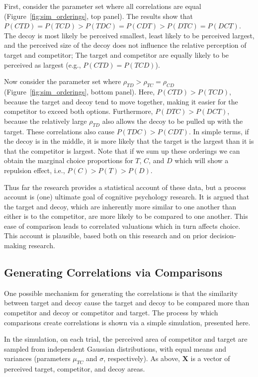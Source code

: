 First, consider the parameter set where all correlations are equal (Figure~\ref{fig:sim_orderings}, top panel). The results show that $P(CTD)=P(TCD)>P(TDC)=P(CDT)>P(DTC)=P(DCT)$. The decoy is most likely be perceived smallest, least likely to be perceived largest, and the perceived size of the decoy does not influence the relative perception of target and competitor; The target and competitor are equally likely to be perceived as largest (e.g., $P(CTD)=P(TCD)$).

Now consider the parameter set where $\rho_{TD}>\rho_{TC}=\rho_{CD}$ (Figure~\ref{fig:sim_orderings}, bottom panel). Here, $P(CTD)>P(TCD)$, because the target and decoy tend to move together, making it easier for the competitor to exceed both options. Furthermore, $P(DTC)>P(DCT)$, because the relatively large $\rho_{TD}$ also allows the decoy to be pulled up with the target. These correlations also cause $P(TDC)>P(CDT)$. In simple terms, if the decoy is in the middle, it is more likely that the target is the largest than it is that the competitor is largest. Note that if we sum up these orderings we can obtain the marginal choice proportions for $T$, $C$, and $D$ which will show a repulsion effect, i.e., $P(C)>P(T)>P(D)$. 

Thus far the research provides a statistical account of these data, but a process account is (one) ultimate goal of cognitive psychology research. It is argued that the target and decoy, which are inherently more similar to one another than either is to the competitor, are more likely to be compared to one another. This ease of comparison leads to correlated valuations which in turn affects choice. This account is plausible, based both on this research and on prior decision-making research.

\subsection{Generating Correlations via Comparisons}
One possible mechanism for generating the correlations is that the similarity between target and decoy cause the target and decoy to be compared more than competitor and decoy or competitor and target. The process by which comparisons create correlations is shown via a simple simulation, presented here.

In the simulation, on each trial, the perceived area of competitor and target are sampled from independent Gaussian distributions, with equal means and variances (parameters $\mu_{TC}$ and $\sigma$, respectively). As above, $\bm{X}$ is a vector of perceived target, competitor, and decoy areas.


